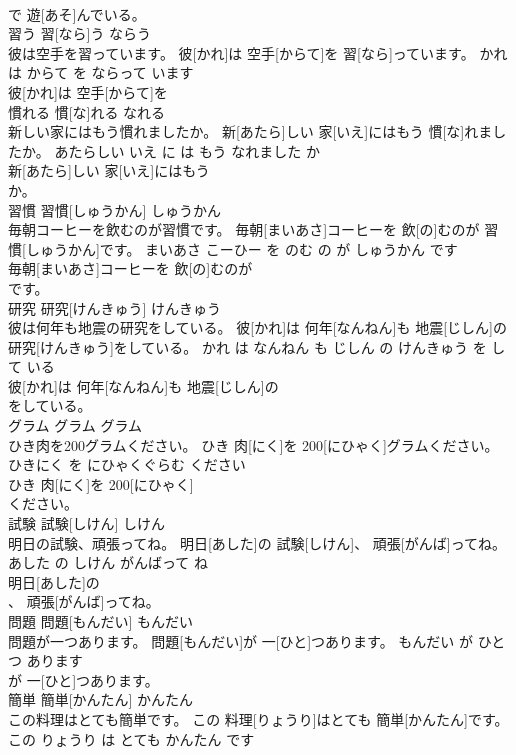 \documentclass[8pt]{extreport}
\begin{document}
\begin{CJK}{UTF8}{min}
\\	で 遊[あそ]んでいる。			
\\	習う	習[なら]う	ならう	
\\	彼は空手を習っています。	彼[かれ]は 空手[からて]を 習[なら]っています。	かれ は からて を ならって います	
\\	彼[かれ]は 空手[からて]を
\\	慣れる	慣[な]れる	なれる	
\\	新しい家にはもう慣れましたか。	新[あたら]しい 家[いえ]にはもう 慣[な]れましたか。	あたらしい いえ に は もう なれました か	
\\	新[あたら]しい 家[いえ]にはもう
\\	か。			
\\	習慣	習慣[しゅうかん]	しゅうかん	
\\	毎朝コーヒーを飲むのが習慣です。	毎朝[まいあさ]コーヒーを 飲[の]むのが 習慣[しゅうかん]です。	まいあさ こーひー を のむ の が しゅうかん です	
\\	毎朝[まいあさ]コーヒーを 飲[の]むのが
\\	です。			
\\	研究	研究[けんきゅう]	けんきゅう	
\\	彼は何年も地震の研究をしている。	彼[かれ]は 何年[なんねん]も 地震[じしん]の 研究[けんきゅう]をしている。	かれ は なんねん も じしん の けんきゅう を して いる	
\\	彼[かれ]は 何年[なんねん]も 地震[じしん]の
\\	をしている。			
\\	グラム	グラム	グラム	
\\	ひき肉を200グラムください。	ひき 肉[にく]を 200[にひゃく]グラムください。	ひきにく を にひゃくぐらむ ください	
\\	ひき 肉[にく]を 200[にひゃく]
\\	ください。			
\\	試験	試験[しけん]	しけん	
\\	明日の試験、頑張ってね。	明日[あした]の 試験[しけん]、 頑張[がんば]ってね。	あした の しけん がんばって ね	
\\	明日[あした]の
\\	、 頑張[がんば]ってね。			
\\	問題	問題[もんだい]	もんだい	
\\	問題が一つあります。	問題[もんだい]が 一[ひと]つあります。	もんだい が ひとつ あります	
\\	が 一[ひと]つあります。			
\\	簡単	簡単[かんたん]	かんたん	
\\	この料理はとても簡単です。	この 料理[りょうり]はとても 簡単[かんたん]です。	この りょうり は とても かんたん です	

\end{CJK}
\end{document}
